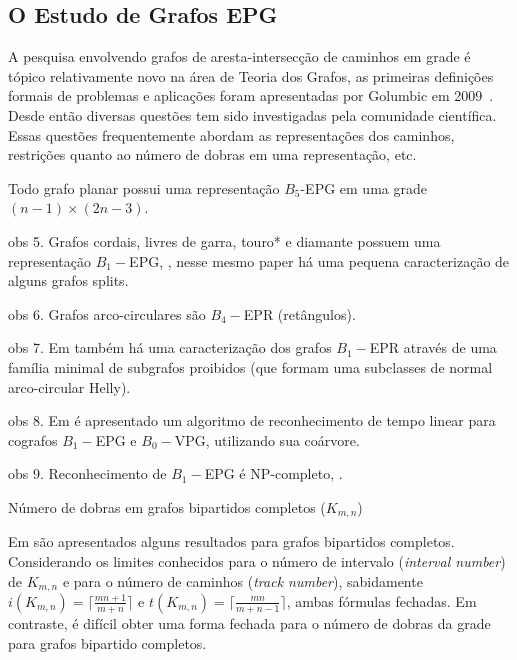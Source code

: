 



\subsection{O Estudo de Grafos EPG}

A pesquisa envolvendo grafos de aresta-intersecção de caminhos em grade é tópico relativamente novo na área de Teoria dos Grafos, as primeiras definições formais de problemas e aplicações foram apresentadas por Golumbic em 2009~\cite{golumbic2009}. Desde então diversas questões tem sido investigadas pela comunidade científica. Essas questões frequentemente abordam as representações dos caminhos, restrições quanto ao número de dobras em uma representação, etc.




\begin{theorem}
Todo grafo planar possui uma representação $B_{5}$-EPG em uma grade $(n-1)\times (2n-3)$.
\end{theorem}

obs 5. Grafos cordais, livres de garra, touro* e diamante possuem uma representação $B_{1}-$EPG, \citep{ries2009}, nesse mesmo paper há uma pequena caracterização de alguns grafos splits.

obs 6. Grafos arco-circulares são $B_{4}-$EPR (retângulos).

obs 7. Em \citep{alcon2016} também há uma caracterização dos grafos $B_{1}-$EPR através de uma família minimal de subgrafos proibidos (que formam uma subclasses de normal arco-circular Helly).

obs 8. Em \citet{cohen2014} é apresentado um algoritmo de reconhecimento de tempo linear para cografos $B_{1}-$EPG e  $B_{0}-$VPG, utilizando sua coárvore.

obs 9. Reconhecimento de $B_{1}-$EPG é NP-completo, \citep{heldt2014}.


Número de dobras em grafos bipartidos completos ($K_{m,n}$)

Em \cite{heldt2014} são apresentados alguns resultados para grafos bipartidos completos. Considerando os limites conhecidos para o número de intervalo (\textit{interval number}) de $K_{m,n}$ e para o número de caminhos (\textit{track number}), sabidamente $i(K_{m,n})= \lceil \frac{mn+1}{m+n} \rceil$ e $t(K_{m,n})= \lceil \frac{mn}{m+n-1} \rceil$, ambas fórmulas fechadas. Em contraste, é difícil obter uma forma fechada para o número de dobras da grade para grafos bipartido completos.


